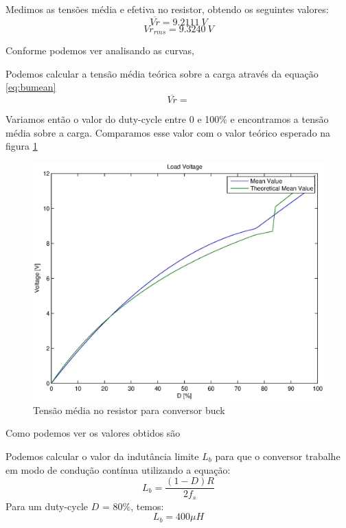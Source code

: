 \documentclass{article}
\begin{document}
Medimos as tensões média e efetiva no resistor, obtendo os seguintes valores:
\begin{equation}
\overline{Vr} = 9.2111\ V
\end{equation}
\begin{equation}
Vr_{rms} = 9.3240\ V
\end{equation}

Conforme podemos ver analisando as curvas, %

Podemos calcular a tensão média teórica sobre a carga através da equação \ref{eq:bumean}
\begin{equation}
\overline{Vr} = 
\label{eq:bumean}
\end{equation}

Variamos então o valor do duty-cycle entre 0 e 100\% e encontramos a tensão média sobre a carga. Comparamos esse valor com o valor teórico esperado na figura \ref{fig:buvrxd}
\begin{figure}[H]
	\centering
	\includegraphics[width=0.7\linewidth]{matlab/buck/r_vrxd}
	\caption{Tensão média no resistor para conversor buck}
	\label{fig:buvrxd}
\end{figure}

Como podemos ver os valores obtidos são %

Podemos calcular o valor da indutância limite $L_b$ para que o conversor trabalhe em modo de condução contínua utilizando a equação:
\begin{equation}
	L_b = \frac{(1 - D)R}{2f_s}
\end{equation}
Para um duty-cycle $D$ = $80\%$, temos:
\begin{equation}
	L_b = 400\mu H
\end{equation}
\end{document}
